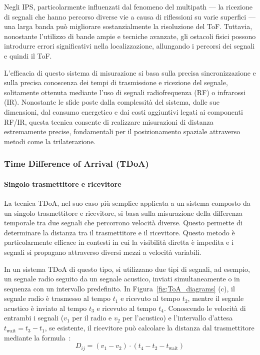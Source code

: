 Negli IPS, particolarmente influenzati dal fenomeno del multipath — la ricezione di segnali che hanno percorso diverse vie a causa di riflessioni su varie superfici — una larga banda può migliorare sostanzialmente la risoluzione del ToF. Tuttavia, nonostante l'utilizzo di bande ampie e tecniche avanzate, gli ostacoli fisici possono introdurre errori significativi nella localizzazione, allungando i percorsi dei segnali e quindi il ToF.

\noindent L'efficacia di questo sistema di misurazione si basa sulla precisa sincronizzazione e sulla precisa conoscenza dei tempi di trasmissione e ricezione del segnale, solitamente ottenuta mediante l'uso di segnali radiofrequenza (RF) o infrarossi (IR). Nonostante le sfide poste dalla complessità del sistema, dalle sue dimensioni, dal consumo energetico e dai costi aggiuntivi legati ai componenti RF/IR, questa tecnica consente di realizzare misurazioni di distanza estremamente precise, fondamentali per il posizionamento spaziale attraverso metodi come la trilaterazione.

\subsubsection{Time Difference of Arrival (TDoA)}


\paragraph{Singolo trasmettitore e ricevitore}

La tecnica TDoA, nel suo caso più semplice applicata a un sistema composto da un singolo trasmettitore e ricevitore, si basa sulla misurazione della differenza temporale tra due segnali che percorrono velocità diverse. Questo permette di determinare la distanza tra il trasmettitore e il ricevitore. Questo metodo è particolarmente efficace in contesti in cui la visibilità diretta è impedita e i segnali si propagano attraverso diversi mezzi a velocità variabili.

In un sistema TDoA di questo tipo, si utilizzano due tipi di segnali, ad esempio, un segnale radio seguito da un segnale acustico, inviati simultaneamente o in sequenza con un intervallo predefinito. In Figura~\ref{fig:ToA_diagrams} (c), il segnale radio è trasmesso al tempo \(t_1\) e ricevuto al tempo \(t_2\), mentre il segnale acustico è inviato al tempo \(t_3\) e ricevuto al tempo \(t_4\). Conoscendo le velocità di entrambi i segnali (\(v_1\) per il radio e \(v_2\) per l'acustico) e l'intervallo d'attesa \(t_{\text{wait}} = t_3 - t_1\), se esistente, il ricevitore può calcolare la distanza dal trasmettitore mediante la formula~\cite{Dargie2010FundamentalsWS}:
\begin{equation}
    D_{ij} = (v_1 - v_2) \cdot (t_4 - t_2 - t_{\text{wait}})
\end{equation}

